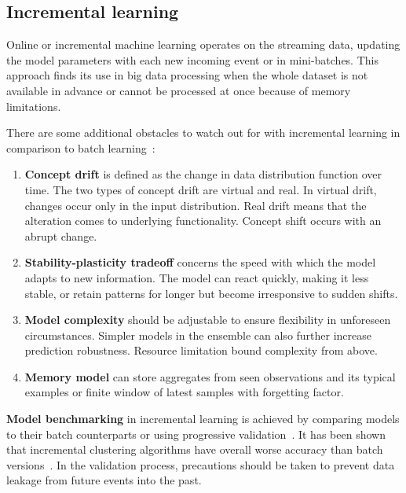 \subsection{Incremental learning}
Online or incremental machine learning operates on the streaming data, updating the model parameters with each new incoming event or in mini-batches. This approach finds its use in big data processing when the whole dataset is not available in advance or cannot be processed at once because of memory limitations. 

There are some additional obstacles to watch out for with incremental learning in comparison to batch learning~\cite{gepperth_incremental_2016}:

\begin{enumerate}
    \itemsep0pt

    \item \textbf{Concept drift} is defined as the change in data distribution function over time. The two types of concept drift are virtual and real. In virtual drift, changes occur only in the input distribution. Real drift means that the alteration comes to underlying functionality. Concept shift occurs with an abrupt change.

    \item \textbf{Stability-plasticity tradeoff} concerns the speed with which the model adapts to new information. The model can react quickly, making it less stable, or retain patterns for longer but become irresponsive to sudden shifts.

    \item \textbf{Model complexity} should be adjustable to ensure flexibility in unforeseen circumstances. Simpler models in the ensemble can also further increase prediction robustness. Resource limitation bound complexity from above.

    \item \textbf{Memory model} can store aggregates from seen observations and its typical examples or finite window of latest samples with forgetting factor.
\end{enumerate}


\textbf{Model benchmarking} in incremental learning is achieved by comparing models to their batch counterparts or using progressive validation~\cite{blum_beating_1999, halford_correct_2020}. It has been shown that incremental clustering algorithms have overall worse accuracy than batch versions~\cite{gepperth_incremental_2016}. In the validation process, precautions should be taken to prevent data leakage from future events into the past.

